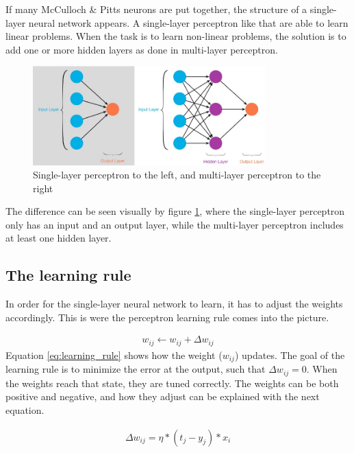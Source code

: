 \documentclass[USenglish]{ifimaster}  %
\begin{document}
If many McCulloch \& Pitts neurons are put together, the structure of a single-layer neural network appears. A single-layer perceptron like that are able to learn linear problems. When the task is to learn non-linear problems, the solution is to add one or more hidden layers as done in multi-layer perceptron.   
\begin{figure}[H]
    \centering
    \includegraphics[width=0.8\textwidth]{bilder/slp_&_mlp.jpeg}
    \caption{Single-layer perceptron to the left, and multi-layer perceptron to the right \cite{website:slp_mlp}}
    \label{fig:slp_mlp}
\end{figure}
The difference can be seen visually by figure \cref{fig:slp_mlp}, where the single-layer perceptron only has an input and an output layer, while the multi-layer perceptron includes at least one hidden layer.
\newline
\newline
\subsection{The learning rule}
In order for the single-layer neural network to learn, it has to adjust the weights accordingly. This is were the perceptron learning rule comes into the picture.

\begin{equation}\label{eq:learning_rule}
\begin{aligned}
w_{ij} \longleftarrow w_{ij} + \Delta w_{ij}
\end{aligned}
\end{equation}
Equation \cref{eq:learning_rule} shows how the weight ($w_{ij}$) updates. The goal of the learning rule is to minimize the error at the output, such that $\Delta w_{ij} = 0 $. When the weights reach that state, they are tuned correctly. The weights can be both positive and negative, and how they adjust can be explained with the next equation. 

\begin{equation}\label{eq:delta_learning_rule}
\begin{aligned}
\Delta w_{ij} = \eta * (t_j - y_j) * x_i 
\end{aligned}
\end{equation}
\end{document}
